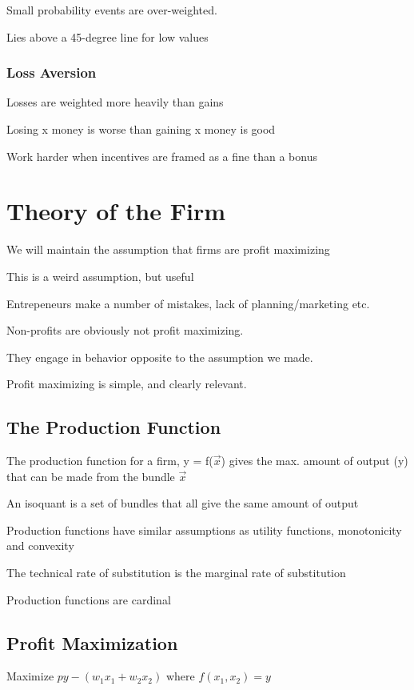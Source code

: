 \documentclass[12pt]{article}
\begin{document}
Small probability events are over-weighted.

Lies above a 45-degree line for low values

\subsubsection{Loss Aversion}

Losses are weighted more heavily than gains

Losing x money is worse than gaining x money is good

Work harder when incentives are framed as a fine than a bonus

\section{Theory of the Firm}

We will maintain the assumption that firms are profit maximizing

This is a weird assumption, but useful

Entrepeneurs make a number of mistakes, lack of planning/marketing etc.

Non-profits are obviously not profit maximizing.

They engage in behavior opposite to the assumption we made.

Profit maximizing is simple, and clearly relevant.

\subsection{The Production Function}

The production function for a firm, y = f($\vec{x}$) gives the max. amount of output (y) that can be made from the bundle $\vec{x}$

An isoquant is a set of bundles that all give the same amount of output

Production functions have similar assumptions as utility functions, monotonicity and convexity

The technical rate of substitution is the marginal rate of substitution

Production functions are cardinal

\subsection{Profit Maximization}

Maximize $py - (w_{1}x_{1} + w_{2}x_{2})$ where $f(x_{1},x_{2}) = y$
\end{document}
